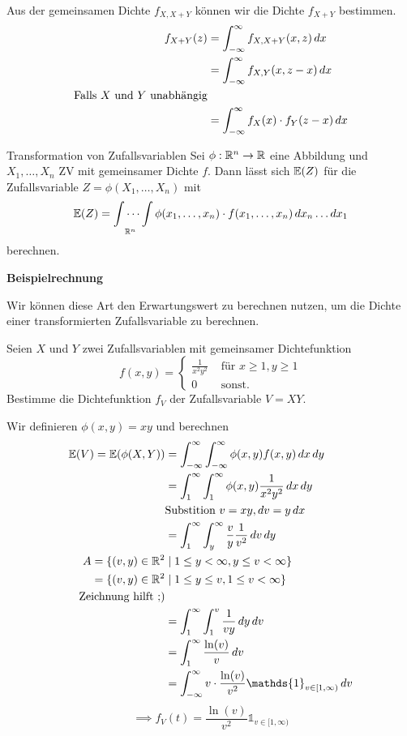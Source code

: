 Aus der gemeinsamen Dichte $f_{X, X + Y}$ können wir die Dichte $f_{X + Y}$ bestimmen.
\begin{align*}
    f_{X+Y}(z) &= \int_{-\infty}^{\infty}f_{X, X + Y}(x, z) \mathop{dx}\\
    &= \int_{-\infty}^{\infty} f_{X,Y}(x, z-x) \mathop{dx}\\
    \text{Falls $X$ und $Y$ unabhängig}\\
    &= \int_{-\infty}^{\infty}f_X(x)\cdot f_Y(z-x) \mathop{dx}
\end{align*}
\begin{subbox}{Transformation von Zufallsvariablen}
    Sei $\phi: \mathbb{R}^n \to \mathbb{R}$ eine Abbildung und $X_1, \ldots, X_n$ ZV mit gemeinsamer Dichte $f$. 
    Dann lässt sich $\mathbb{E}(Z)$ für die Zufallsvariable $Z=\phi(X_1, \ldots, X_n)$ mit 
    $$\mathbb{E}(Z) =\idotsint\limits_{\mathbb{R}^n}\phi(x_1, \ldots, x_n)\cdot f(x_1, \ldots, x_n)\mathop{dx_n}\ldots\mathop{dx_1}$$
    berechnen.
\end{subbox}
\textbf{Beispielrechnung}

Wir können diese Art den Erwartungswert zu berechnen nutzen, um die Dichte einer transformierten Zufallsvariable zu berechnen.

Seien $X$ und $Y$ zwei Zufallsvariablen mit gemeinsamer Dichtefunktion
$$f(x,y) = \begin{cases}
    \frac{1}{x^2y^2} & \text{ für } x \geq 1, y \geq 1\\
    0 & \text{ sonst.}
\end{cases}$$
Bestimme die Dichtefunktion $f_V$ der Zufallsvariable $V = XY$.

Wir definieren $\phi(x, y) = xy$ und berechnen 
\begin{align*}
    \E(V) = \E(\phi(X,Y)) &= \int_{-\infty}^{\infty}\int_{-\infty}^{\infty}\phi(x,y)f(x,y)\dx\mathop{dy}\\
    &= \int_{1}^{\infty}\int_{1}^{\infty}\phi(x, y)\frac{1}{x^2y^2}\dx\mathop{dy}\\
    &\text{Substition } v = xy, \mathop{dv} = y\mathop{dx}\\
    &= \int_{1}^{\infty}\int_{y}^{\infty}\frac{v}{y}\frac{1}{v^2}\mathop{dv}\mathop{dy}\\
    A = \{(v, y) \in \R^2 &\mid 1 \leq y < \infty, y \leq v < \infty\}\\
    = \{(v, y) \in \R^2 &\mid 1 \leq y \leq v, 1 \leq v < \infty\}\\
    \text{Zeichnung hilft ;)}\\
    &= \int_{1}^{\infty}\int_{1}^{v}\frac{1}{vy}\mathop{dy}\mathop{dv}\\
    &= \int_{1}^{\infty}\frac{\ln(v)}{v}\mathop{dv}\\
    &= \int_{-\infty}^{\infty}v \cdot \frac{\ln(v)}{v^2}\mathds{1}_{v \in [1,\infty)}\mathop{dv}
\end{align*}
$$\implies f_V(t) = \frac{\ln(v)}{v^2}\mathds{1}_{v \in [1,\infty)}$$


